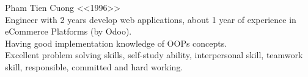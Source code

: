 \documentclass[9pt]{developercv} %
\begin{document}
\vspace{0.5cm}



\begin{minipage}[t]{0.4\textwidth} %
	\vspace{-\baselineskip} %
	
    Pham Tien Cuong <<1996>>\\
    Engineer with 2 years develop web applications, about 1 year of experience in eCommerce Platforms (by Odoo).\\
    Having good implementation knowledge of OOPs concepts.\\
    Excellent problem solving skills, self-study ability, interpersonal skill, teamwork skill, responsible, committed and hard working.
\end{minipage}
\hfill %
\begin{minipage}[t]{0.5\textwidth} %
	\vspace{-\baselineskip} %
	\begin{barchart}{5.5}
	\end{barchart}
\end{minipage}



\end{document}
